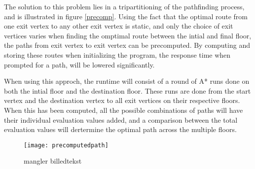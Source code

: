 The solution to this problem lies in a tripartitioning of the pathfinding process, and is illustrated in figure \ref{precomp}. Using the fact that the optimal route from one exit vertex to any other exit vertex is static, and only the choice of exit vertices varies when finding the omptimal route between the intial and final floor, the paths from exit vertex to exit vertex can be precomputed. By computing and storing these routes when initializing the program, the response time when prompted for a path, will be lowered significantly.

When using this approch, the runtime will consist of a round of A* runs done on both the intial floor and the destination floor. These runs are done from the start vertex and the destination vertex to all exit vertices on their respective floors. When this has been computed, all the possible combinations of paths will have their individual evaluation values added, and a comparison between the total evaluation values will dertermine the optimal path across the multiple floors.

\begin{figure}[ht!]
    \centering
    \texttt{[image: precomputedpath]}
    \caption{mangler billedtekst}
    \label{fig:precomp}
  \end{figure}



